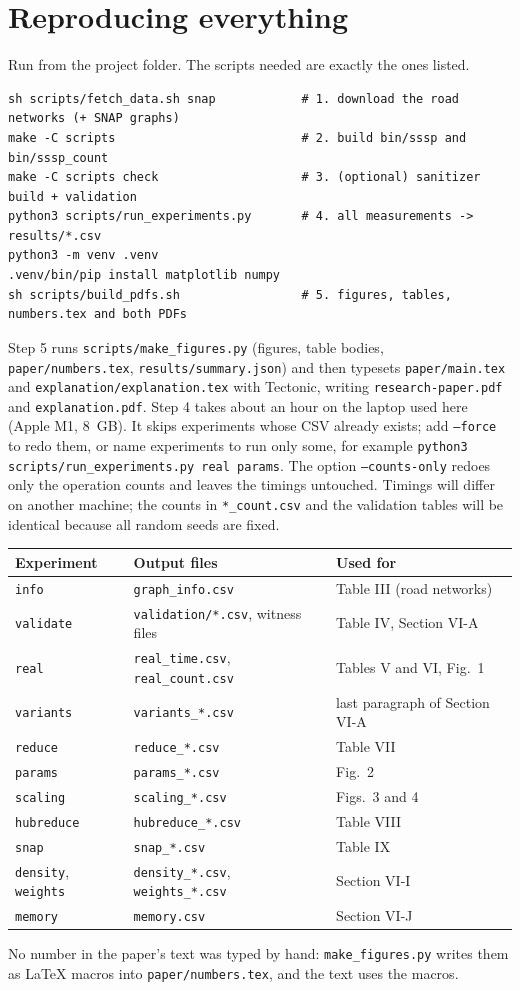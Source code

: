 \documentclass[11pt,a4paper]{article}
\newcommand{\code}[1]{\texttt{#1}}
\begin{document}
\section{Reproducing everything}\label{sec:repro}
Run from the project folder. The scripts needed are exactly the ones listed.
\begin{lstlisting}
sh scripts/fetch_data.sh snap            # 1. download the road networks (+ SNAP graphs)
make -C scripts                          # 2. build bin/sssp and bin/sssp_count
make -C scripts check                    # 3. (optional) sanitizer build + validation
python3 scripts/run_experiments.py       # 4. all measurements -> results/*.csv
python3 -m venv .venv
.venv/bin/pip install matplotlib numpy
sh scripts/build_pdfs.sh                 # 5. figures, tables, numbers.tex and both PDFs
\end{lstlisting}
Step 5 runs \code{scripts/make\_figures.py} (figures, table bodies, \code{paper/numbers.tex}, \code{results/summary.json}) and then typesets \code{paper/main.tex} and \code{explanation/explanation.tex} with Tectonic, writing \code{research-paper.pdf} and \code{explanation.pdf}.
Step 4 takes about an hour on the laptop used here (Apple M1, 8~GB). It skips experiments whose CSV already exists; add \code{--force} to redo them, or name experiments to run only some, for example \code{python3 scripts/run\_experiments.py real params}. The option \code{--counts-only} redoes only the operation counts and leaves the timings untouched. Timings will differ on another machine; the counts in \code{*\_count.csv} and the validation tables will be identical because all random seeds are fixed.

\begin{longtable}{@{}p{2.2cm}p{4.9cm}p{8.1cm}@{}}
\toprule
Experiment & Output files & Used for\\
\midrule
\code{info} & \code{graph\_info.csv} & Table III (road networks)\\
\code{validate} & \code{validation/*.csv}, witness files & Table IV, Section VI-A\\
\code{real} & \code{real\_time.csv}, \code{real\_count.csv} & Tables V and VI, Fig.~1\\
\code{variants} & \code{variants\_*.csv} & last paragraph of Section VI-A\\
\code{reduce} & \code{reduce\_*.csv} & Table VII\\
\code{params} & \code{params\_*.csv} & Fig.~2\\
\code{scaling} & \code{scaling\_*.csv} & Figs.~3 and 4\\
\code{hubreduce} & \code{hubreduce\_*.csv} & Table VIII\\
\code{snap} & \code{snap\_*.csv} & Table IX\\
\code{density}, \code{weights} & \code{density\_*.csv}, \code{weights\_*.csv} & Section VI-I\\
\code{memory} & \code{memory.csv} & Section VI-J\\
\bottomrule
\end{longtable}
No number in the paper's text was typed by hand: \code{make\_figures.py} writes them as LaTeX macros into \code{paper/numbers.tex}, and the text uses the macros.
\end{document}
